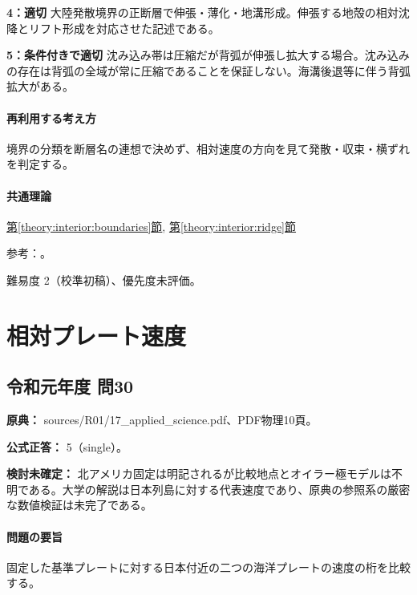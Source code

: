 \noindent\textbf{4：適切} 大陸発散境界の正断層で伸張・薄化・地溝形成。伸張する地殻の相対沈降とリフト形成を対応させた記述である。\par

\noindent\textbf{5：条件付きで適切} 沈み込み帯は圧縮だが背弧が伸張し拡大する場合。沈み込みの存在は背弧の全域が常に圧縮であることを保証しない。海溝後退等に伴う背弧拡大がある。\par

\paragraph{再利用する考え方} 境界の分類を断層名の連想で決めず、相対速度の方向を見て発散・収束・横ずれを判定する。

\paragraph{共通理論} \hyperref[theory:interior:boundaries]{第\ref*{theory:interior:boundaries}節}, \hyperref[theory:interior:ridge]{第\ref*{theory:interior:ridge}節}

\par 参考：\cite{usgs_plate_boundaries,umich_crust_teaching,noaa_ultraslow2004}。

\par 難易度 2（校準初稿）、優先度未評価。

\section{相対プレート速度}

\subsection{令和元年度 問30}
\label{q:r01-reg-applied-30}

\noindent\textbf{原典：} sources/R01/17\_applied\_science.pdf、PDF物理10頁。

\textbf{公式正答：} 5（single）。

\par\textbf{検討未確定：} 北アメリカ固定は明記されるが比較地点とオイラー極モデルは不明である。大学の解説は日本列島に対する代表速度であり、原典の参照系の厳密な数値検証は未完了である。

\paragraph{問題の要旨} 固定した基準プレートに対する日本付近の二つの海洋プレートの速度の桁を比較する。

